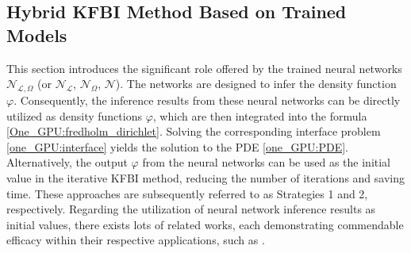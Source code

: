 \documentclass{article}
\begin{document}
\subsection{Hybrid KFBI Method Based on Trained Models} \label{Hybrid KFBI Method Based on Trained Models}
This section introduces the significant role offered by the trained neural networks $\mathcal{N}_{\mathcal{L}, \Omega}$ (or $\mathcal{N}_{\mathcal{L}}$, $\mathcal{N}_{\Omega}$, $\mathcal{N}$). The networks are designed to infer the density function $\varphi$. Consequently, the inference results from these neural networks can be directly utilized as density functions $\varphi$, which are then integrated into the formula \eqref{One_GPU:fredholm_dirichlet}. Solving the corresponding interface problem \eqref{one_GPU:interface} yields the solution to the PDE \eqref{one_GPU:PDE}. Alternatively, the output $\varphi$ from the neural networks can be used as the initial value in the iterative KFBI method, reducing the number of iterations and saving time. These approaches are subsequently referred to as Strategies 1 and 2, respectively. Regarding the utilization of neural network inference results as initial values, there exists lots of related works, each demonstrating commendable efficacy within their respective applications, such as \cite{luna2021accelerating}.
\end{document}
